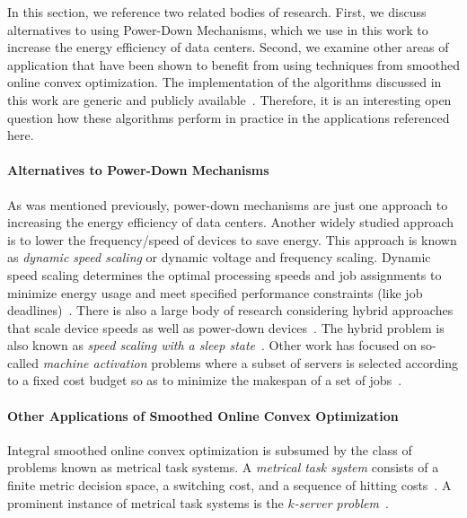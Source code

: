 In this section, we reference two related bodies of research. First, we discuss alternatives to using Power-Down Mechanisms, which we use in this work to increase the energy efficiency of data centers. Second, we examine other areas of application that have been shown to benefit from using techniques from smoothed online convex optimization. The implementation of the algorithms discussed in this work are generic and publicly available~\cite{Huebotter2021}. Therefore, it is an interesting open question how these algorithms perform in practice in the applications referenced here.

\paragraph{Alternatives to Power-Down Mechanisms} As was mentioned previously, power-down mechanisms are just one approach to increasing the energy efficiency of data centers. Another widely studied approach is to lower the frequency/speed of devices to save energy. This approach is known as \emph{dynamic speed scaling} or dynamic voltage and frequency scaling. Dynamic speed scaling determines the optimal processing speeds and job assignments to minimize energy usage and meet specified performance constraints (like job deadlines)~\cite{Albers2007, Albers2011, Jin2016}. There is also a large body of research considering hybrid approaches that scale device speeds as well as power-down devices~\cite{Jin2016}. The hybrid problem is also known as \emph{speed scaling with a sleep state}~\cite{Albers2014}. Other work has focused on so-called \emph{machine activation} problems where a subset of servers is selected according to a fixed cost budget so as to minimize the makespan of a set of jobs~\cite{Khuller2009, Li2011}.

\paragraph{Other Applications of Smoothed Online Convex Optimization} Integral smoothed online convex optimization is subsumed by the class of problems known as metrical task systems. A \emph{metrical task system} consists of a finite metric decision space, a switching cost, and a sequence of hitting costs~\cite{Bubeck2018_3}. A prominent instance of metrical task systems is the \emph{$k$-server problem}~\cite{Bubeck2017}.

